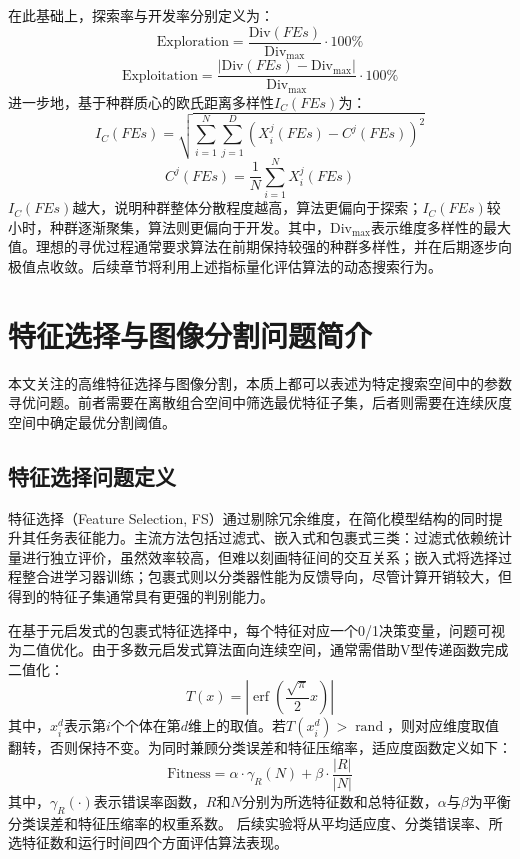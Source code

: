 在此基础上，探索率与开发率分别定义为：
\begin{equation}
\text{Exploration}=\frac{\text{Div}\left(FEs\right)}{\text{Div}_{\max}}\cdot 100\%
\end{equation}
\begin{equation}
\text{Exploitation}=\frac{\left|\text{Div}\left(FEs\right)-\text{Div}_{\max}\right|}{\text{Div}_{\max}}\cdot 100\%
\end{equation}
进一步地，基于种群质心的欧氏距离多样性$I_C(FEs)$为：
\begin{equation}
I_C(FEs) = \sqrt{\sum^{N}_{i=1}{\sum^{D}_{j=1}{{\left(X^j_i\left(FEs\right)-C^j(FEs)\right)}^{2}}}}
\end{equation}
\begin{equation}
C^j(FEs) = \frac{1}{N}\sum^N_{i=1}{X^j_i\left(FEs\right)}
\end{equation}
$I_C(FEs)$越大，说明种群整体分散程度越高，算法更偏向于探索；$I_C(FEs)$较小时，种群逐渐聚集，算法则更偏向于开发。其中，$\text{Div}_{\max}$表示维度多样性的最大值。理想的寻优过程通常要求算法在前期保持较强的种群多样性，并在后期逐步向极值点收敛。后续章节将利用上述指标量化评估算法的动态搜索行为。

\section{特征选择与图像分割问题简介}

本文关注的高维特征选择与图像分割，本质上都可以表述为特定搜索空间中的参数寻优问题。前者需要在离散组合空间中筛选最优特征子集，后者则需要在连续灰度空间中确定最优分割阈值。

\subsection{特征选择问题定义}

特征选择（Feature Selection, FS）通过剔除冗余维度，在简化模型结构的同时提升其任务表征能力\cite{ibsa_ref50}。主流方法包括过滤式、嵌入式和包裹式三类\cite{sbo_ref61}：过滤式依赖统计量进行独立评价，虽然效率较高，但难以刻画特征间的交互关系\cite{sbo_ref62}；嵌入式将选择过程整合进学习器训练；包裹式则以分类器性能为反馈导向，尽管计算开销较大，但得到的特征子集通常具有更强的判别能力\cite{ibsa_ref23,sbo_ref64}。

在基于元启发式的包裹式特征选择中，每个特征对应一个0/1决策变量，问题可视为二值优化。由于多数元启发式算法面向连续空间，通常需借助V型传递函数完成二值化：
\begin{equation}
T(x) = \left| \operatorname{erf}\left(\frac{\sqrt{\pi}}{2} x\right) \right|
\end{equation}
其中，$x_i^d$表示第$i$个个体在第$d$维上的取值。若$T(x_i^d) > \operatorname{rand}$，则对应维度取值翻转，否则保持不变。为同时兼顾分类误差和特征压缩率，适应度函数定义如下：
\begin{equation}
\text{Fitness}=\alpha\cdot \gamma_R\left(N\right)+\beta\cdot \frac{\left|R\right|}{\left|N\right|}
\end{equation}
其中，$\gamma_R(\cdot)$表示错误率函数，$R$和$N$分别为所选特征数和总特征数，$\alpha$与$\beta$为平衡分类误差和特征压缩率的权重系数。
后续实验将从平均适应度、分类错误率、所选特征数和运行时间四个方面评估算法表现。

